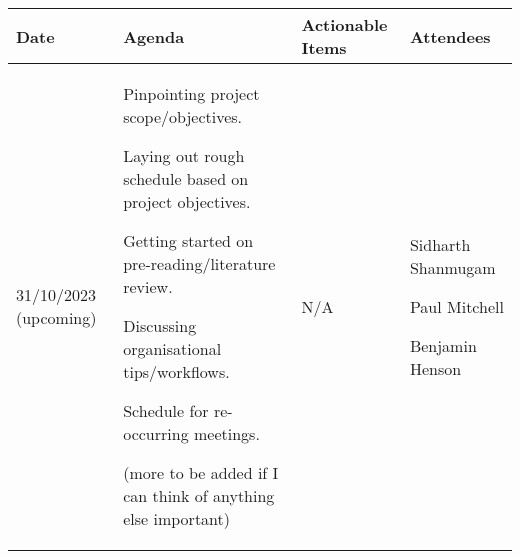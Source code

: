 \begin{table}[!h]
    \centering
    \begin{tabularx}{\textwidth}{|l|X|X|X|}
        \hline
        Date & Agenda & Actionable Items & Attendees \\
        \hline
        \hline
        31/10/2023 (upcoming) & 
        \begin{myitemize}
            \item Pinpointing project scope/objectives.
            \item Laying out rough schedule based on project objectives.
            \item Getting started on pre-reading/literature review.
            \item Discussing organisational tips/workflows.
            \item Schedule for re-occurring meetings.
            \item (more to be added if I can think of anything else important)
        \end{myitemize} & 
        \begin{myitemize}
            \item N/A
        \end{myitemize} & 
        \begin{myitemize}
            \item Sidharth Shanmugam
            \item Paul Mitchell
            \item Benjamin Henson
        \end{myitemize} \\
        \hline
    \end{tabularx}
\end{table}
